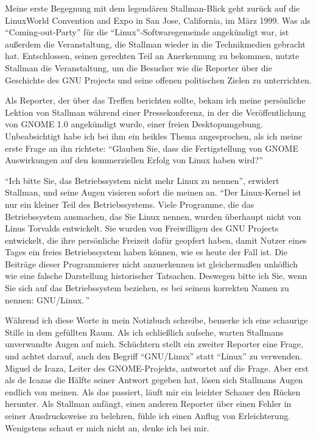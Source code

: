 Meine erste Begegnung mit dem legendären Stallman-Blick geht zurück auf die LinuxWorld Convention and Expo in San Jose, California, im März 1999. Was als "`Coming-out-Party"' für die "`Linux"'-Softwaregemeinde angekündigt war, ist außerdem die Veranstaltung, die Stallman wieder in die Technikmedien gebracht hat. Entschlossen, seinen gerechten Teil an Anerkennung zu bekommen, nutzte Stallman die Veranstaltung, um die Besucher wie die Reporter über die Geschichte des GNU Projects und seine offenen politischen Zielen zu unterrichten.

Als Reporter, der über das Treffen berichten sollte, bekam ich meine persönliche Lektion von Stallman während einer Pressekonferenz, in der die Veröffentlichung von GNOME 1.0 angekündigt wurde, einer freien Desktopumgebung. Unbeabsichtigt habe ich bei ihm ein heikles Thema angesprochen, als ich meine erste Frage an ihn richtete: "`Glauben Sie, dass die Fertigstellung von GNOME Auswirkungen auf den kommerziellen Erfolg von Linux haben wird?"'

"`Ich bitte Sie, das Betriebssystem nicht mehr \glq Linux\grq{} zu nennen"', erwidert Stallman, und seine Augen visieren sofort die meinen an. "`Der Linux-Kernel ist nur ein kleiner Teil des Betriebssystems. Viele Programme, die das Betriebssystem ausmachen, das Sie \glq Linux\grq{} nennen, wurden überhaupt nicht von Linus Torvalds entwickelt. Sie wurden von Freiwilligen des GNU Projects entwickelt, die ihre persönliche Freizeit dafür geopfert haben, damit Nutzer eines Tages ein freies Betriebssystem haben können, wie es heute der Fall ist. Die Beiträge dieser Programmierer nicht anzuerkennen ist gleichermaßen unhöflich wie eine falsche Darstellung historischer Tatsachen. Deswegen bitte ich Sie, wenn Sie sich auf das Betriebssystem beziehen, es bei seinem korrekten Namen zu nennen: \glq GNU/Linux\grq.\,"'

Während ich diese Worte in mein Notizbuch schreibe, bemerke ich eine schaurige Stille in dem gefüllten Raum. Als ich schließlich aufsehe, warten Stallmans unverwandte Augen auf mich. Schüchtern stellt ein zweiter Reporter eine Frage, und achtet darauf, auch den Begriff "`GNU/Linux"' statt "`Linux"' zu verwenden. Miguel de Icaza, Leiter des GNOME-Projekts, antwortet auf die Frage. Aber erst als de Icazas die Hälfte seiner Antwort gegeben hat, lösen sich Stallmans Augen endlich von meinen. Als das passiert, läuft mir ein leichter Schauer den Rücken herunter. Als Stallman anfängt, einen anderen Reporter über einen Fehler in seiner Ausdrucksweise zu belehren, fühle ich einen Anflug von Erleichterung. Wenigstens schaut er mich nicht an, denke ich bei mir.

